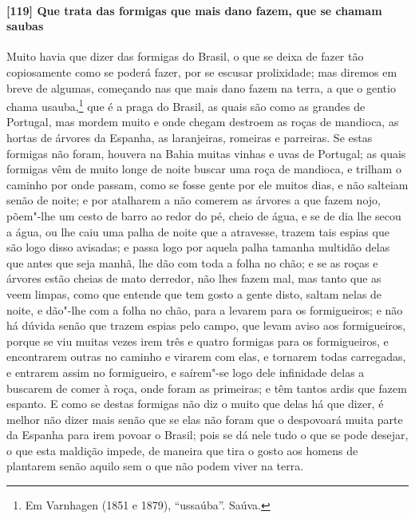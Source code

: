 \begin{linenumbers}
\paragraph{[119] Que trata das formigas que mais dano fazem, que se chamam saubas}\quad
Muito havia que dizer das formigas do Brasil, o que se deixa de fazer tão copiosamente
como se poderá fazer, por se escusar prolixidade; mas diremos em breve de algumas,
começando nas que mais dano fazem na terra, a que o gentio chama usauba,\footnote{ Em
Varnhagen (1851 e 1879), ``ussaúba''. Saúva.} que é a praga do Brasil, as quais são como
as grandes de Portugal, mas mordem muito e onde chegam destroem as roças de mandioca, as
hortas de árvores da Espanha, as laranjeiras, romeiras e parreiras. Se estas formigas não
foram, houvera na Bahia muitas vinhas e uvas de Portugal; as quais formigas vêm de muito
longe de noite buscar uma roça de mandioca, e trilham o caminho por onde passam, como se
fosse gente por ele muitos dias, e não salteiam senão de noite; e por atalharem a não
comerem as árvores a que fazem nojo, põem"-lhe um cesto de barro ao redor do pé, cheio de
água, e se de dia lhe secou a água, ou lhe caiu uma palha de noite que a atravesse, trazem
tais espias que são logo disso avisadas; e passa logo por aquela palha tamanha multidão
delas que antes que seja manhã, lhe dão com toda a folha no chão; e se as roças e árvores
estão cheias de mato derredor, não lhes fazem mal, mas tanto que as veem limpas, como que
entende que tem gosto a gente disto, saltam nelas de noite, e dão"-lhe com a folha no chão,
para a levarem para os formigueiros; e não há dúvida senão que trazem espias pelo campo,
que levam aviso aos formigueiros, porque se viu muitas vezes irem três e quatro formigas
para os formigueiros, e encontrarem outras no caminho e virarem com elas, e tornarem todas
carregadas, e entrarem assim no formigueiro, e saírem"-se logo dele infinidade delas a
buscarem de comer à roça, onde foram as primeiras; e têm tantos ardis que fazem espanto. E
como se destas formigas não diz o muito que delas há que dizer, é melhor não dizer mais
senão que se elas não foram que o despovoará muita parte da Espanha para irem povoar o
Brasil; pois se dá nele tudo o que se pode desejar, o que esta maldição impede, de maneira
que tira o gosto aos homens de plantarem senão aquilo sem o que não podem viver na terra.


\end{linenumbers}
